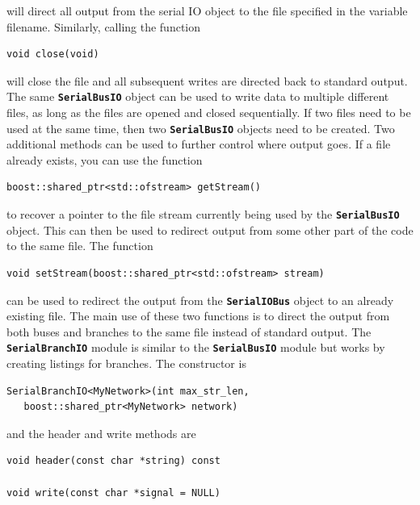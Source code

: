 will direct all output from the serial IO object to the file specified in the variable filename. Similarly, calling the function

{
\color{red}
\begin{Verbatim}[fontseries=b]
void close(void)
\end{Verbatim}
}

will close the file and all subsequent writes are directed back to standard output. The same \texttt{\textbf{SerialBusIO}} object can be used to write data to multiple different files, as long as the files are opened and closed sequentially. If two files need to be used at the same time, then two \texttt{\textbf{SerialBusIO}} objects need to be created. Two additional methods can be used to further control where output goes. If a file already exists, you can use the function

{
\color{red}
\begin{Verbatim}[fontseries=b]
boost::shared_ptr<std::ofstream> getStream()
\end{Verbatim}
}

to recover a pointer to the file stream currently being used by the \texttt{\textbf{SerialBusIO}} object. This can then be used to redirect output from some other part of the code to the same file. The function

{
\color{red}
\begin{Verbatim}[fontseries=b]
void setStream(boost::shared_ptr<std::ofstream> stream)
\end{Verbatim}
}

can be used to redirect the output from the \texttt{\textbf{SerialIOBus}} object to an already existing file. The main use of these two functions is to direct the output from both buses and branches to the same file instead of standard output.
The \texttt{\textbf{SerialBranchIO}} module is similar to the \texttt{\textbf{SerialBusIO}} module but works by creating listings for branches. The constructor is

{
\color{red}
\begin{Verbatim}[fontseries=b]
SerialBranchIO<MyNetwork>(int max_str_len,
   boost::shared_ptr<MyNetwork> network)
\end{Verbatim}
}

and the header and write methods are

{
\color{red}
\begin{Verbatim}[fontseries=b]
void header(const char *string) const

void write(const char *signal = NULL)
\end{Verbatim}
}


